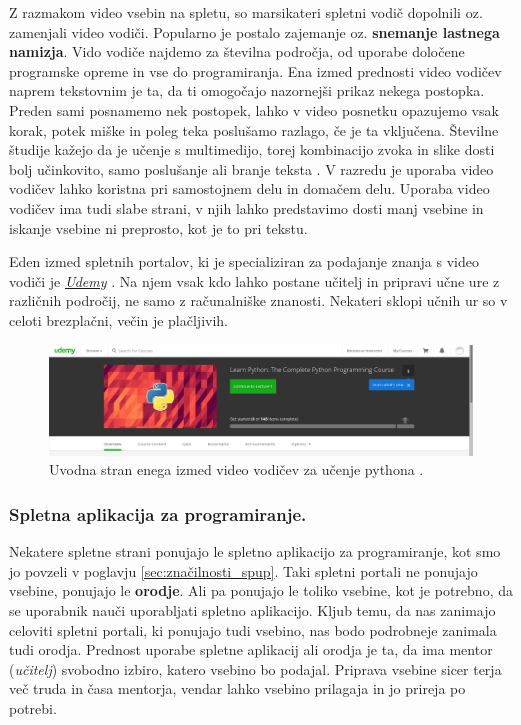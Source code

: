 Z razmakom video vsebin na spletu, so marsikateri spletni vodič
dopolnili oz. zamenjali video vodiči. Popularno je postalo zajemanje
oz. \textbf{snemanje lastnega namizja}. Vido vodiče najdemo za
številna področja, od uporabe določene programske opreme in vse do
programiranja. Ena izmed prednosti video vodičev naprem tekstovnim je
ta, da ti omogočajo nazornejši prikaz nekega postopka. Preden sami
posnamemo nek postopek, lahko v video posnetku opazujemo vsak korak,
potek miške in poleg teka poslušamo razlago, če je ta vključena.
Številne študije kažejo da je učenje s multimedijo, torej kombinacijo
zvoka in slike dosti bolj učinkovito, samo poslušanje ali branje
teksta \cite{web:multimediaL}. V razredu je uporaba video vodičev
lahko koristna pri samostojnem delu in domačem delu. Uporaba video
vodičev ima tudi slabe strani, v njih lahko predstavimo dosti manj
vsebine in iskanje vsebine ni preprosto, kot je to pri tekstu.

Eden izmed spletnih portalov, ki je specializiran za podajanje znanja
s video vodiči je \emph{\href{https://www.udemy.com}{Udemy}}
\cite{web:udemy}. Na njem vsak kdo lahko postane učitelj in pripravi
učne ure z različnih področij, ne samo z računalniške
znanosti. Nekateri sklopi učnih ur so v celoti brezplačni, večin je
plačljivih.

\begin{figure}[h!]
    \includegraphics [width=1\linewidth, keepaspectratio =
    1] {./images/sc_web/udemy_01.png}
    \caption{Uvodna stran enega izmed video vodičev za učenje pythona
      \cite{web:udemy}.}
    \label{fig:scr:web:udemy}
\end{figure}

\subsubsection{Spletna aplikacija za programiranje.}
\label{sec:spletna_app_programiranje}

Nekatere spletne strani ponujajo le spletno aplikacijo za
programiranje, kot smo jo povzeli v poglavju
\ref{sec:značilnosti_spup}. Taki spletni portali ne ponujajo vsebine,
ponujajo le \textbf{orodje}. Ali pa ponujajo le toliko vsebine, kot je
potrebno, da se uporabnik nauči uporabljati spletno aplikacijo. Kljub
temu, da nas zanimajo celoviti spletni portali, ki ponujajo tudi
vsebino, nas bodo podrobneje zanimala tudi orodja. Prednost uporabe
spletne aplikacij ali orodja je ta, da ima mentor (\emph{učitelj})
svobodno izbiro, katero vsebino bo podajal. Priprava vsebine sicer
terja več truda in časa mentorja, vendar lahko vsebino prilagaja in jo
prireja po potrebi.

